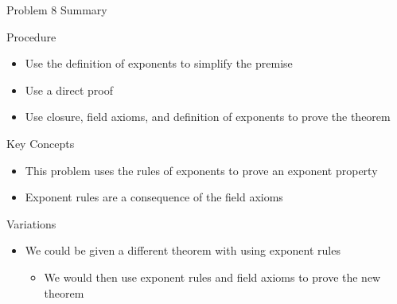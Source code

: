 \begin{summary}{Problem 8 Summary}
    \begin{statement}{Procedure}
        \begin{itemize}
            \item Use the definition of exponents to simplify the premise
            \item Use a direct proof
            \item Use closure, field axioms, and definition of exponents to prove the theorem
        \end{itemize}
    \end{statement}
    \begin{statement}{Key Concepts}
        \begin{itemize}
            \item This problem uses the rules of exponents to prove an exponent property
            \item Exponent rules are a consequence of the field axioms
        \end{itemize}
    \end{statement}
    \begin{statement}{Variations}
        \begin{itemize}
            \item We could be given a different theorem with using exponent rules
            \begin{itemize}
                \item We would then use exponent rules and field axioms to prove the new theorem
            \end{itemize}
        \end{itemize}
    \end{statement}
\end{summary}

